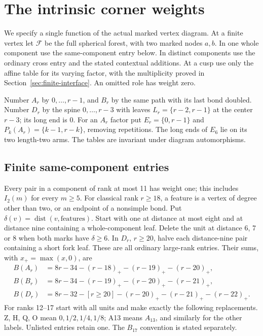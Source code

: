 \documentclass[11pt]{article}
\theoremstyle{remark}\newtheorem{remark}[theorem]{Remark}
\begin{document}
\section{The intrinsic corner weights}\label{app:weights}

We specify a single function of the actual marked vertex diagram.
At a finite vertex let $\mathcal F$ be the full spherical forest,
with two marked nodes $a,b$. In one whole component use the
same-component entry below. In distinct components use the ordinary
cross entry and the stated contextual additions. At a cusp use only
the affine table for its varying factor, with the multiplicity proved
in Section~\ref{sec:finite-interface}. An omitted role has weight zero.

Number $A_r$ by $0,\ldots,r-1$, and $B_r$ by the same path with
its last bond doubled. Number $D_r$ by the spine $0,\ldots,r-3$
with leaves $L_r=\{r-2,r-1\}$ at the center $r-3$; its long end is 0.
For an $A_r$ factor put $E_r=\{0,r-1\}$ and
$P_k(A_r)=\{k-1,r-k\}$, removing repetitions. The long ends of
$E_6$ lie on its two length-two arms. The tables are invariant
under diagram automorphisms.

\subsection{Finite same-component entries}
Every pair in a component of rank at most 11 has weight one;
this includes $I_2(m)$ for every $m\ge5$.
For classical rank $r\ge18$, a feature is a vertex of degree
other than two, or an endpoint of a nonsimple bond. Put
$\delta(v)=\operatorname{dist}(v,\text{features})$.
Start with one at distance at most eight and at distance nine
containing a whole-component leaf. Delete the unit at distance
6, 7 or 8 when both marks have $\delta\ge6$.
In $D_r$, $r\ge20$, halve each distance-nine pair containing a
short fork leaf. These are all ordinary large-rank entries.
Their sums, with $x_+=\max(x,0)$, are
\begin{align*}
 B(A_r)&=8r-34-(r-18)_+-(r-19)_+-(r-20)_+,\\
 B(B_r)&=8r-34-(r-19)_+-(r-20)_+-(r-21)_+,\\
 B(D_r)&=8r-32-[r\ge20]-(r-20)_+-(r-21)_+-(r-22)_+.
\end{align*}
For ranks 12--17 start with all units and make exactly the following
replacements. Z, H, Q, O mean $0,1/2,1/4,1/8$; A13 means
$A_{13}$, and similarly for the other labels. Unlisted entries
retain one. The $B_{17}$ convention is stated separately.
\end{document}
